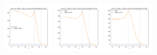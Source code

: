 \documentclass[a4paper]{article}
\begin{document}
\begin{figure}[H]
  \includegraphics[width=0.23\textwidth]{grid-g5-v6-w2_0}
  \includegraphics[width=0.23\textwidth]{grid-g5-v6-w3_0}
  \includegraphics[width=0.23\textwidth]{grid-g5-v6-w4_0}
\end{figure}
\end{document}
